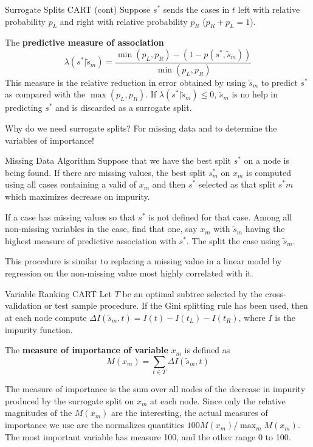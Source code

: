 \documentclass{beamer}
\begin{document}
\begin{frame}{Surrogate Splits CART (cont)}
	Suppose $s^*$ sends the cases in $t$ left with relative probability $p_L$ and right with relative probability $p_R$ ($p_R+p_L=1$).
	
	The \textbf{predictive measure of association} 
	\begin{equation*}
		\lambda(s^*| \tilde{s}_m)= \frac{\min(p_L,p_R)-(1-p(s^*,\tilde{s}_m))}{\min(p_L,p_R)}
	\end{equation*}
	This measure is the relative reduction in error obtained by using $\tilde{s}_m$ to predict $s^*$ as compared with the $\max (p_L,p_R)$. If $\lambda(s^*| \tilde{s}_m)\le 0$, $\tilde{s}_m$ is no help in predicting $s^*$ and is discarded as a surrogate split. 
	
	Why do we need surrogate splits? For missing data and to determine the variables of importance!
	

\end{frame}

\begin{frame}{Missing Data Algorithm}
	Suppose that we have the best split $s^*$ on a node is being found. If there are missing values, the best split $s^*_m$ on $x_m$ is computed using all cases containing a valid of $x_m$ and then $s^*$ selected as that split $s^*m$ which maximizes decrease on impurity.
	
	If a case has missing values so that $s^*$ is not defined for that case. Among all non-missing variables in the case, find that one, say $x_m$ with $\tilde{s}_m$ having the highest measure of predictive association with $s^*$. The split the case using $\tilde{s}_m$.
	
	This procedure is similar to replacing a missing value in a linear model by regression on the non-missing value most highly correlated with it. 
	
\end{frame}

\begin{frame}{Variable Ranking CART}
	Let $T$ be an optimal subtree selected by the cross-validation or test sample procedure. If the Gini splitting rule has been used, then at each node compute $\Delta I(\tilde{s}_m,t)= I(t)-I(t_L)-I(t_R)$, where $I$ is the impurity function.
	
	The \textbf{measure of importance of variable} $x_m$ is defined as
	\begin{equation*}
		M(x_m)= \sum_{t\in T} \Delta I (\tilde{s}_m, t)
	\end{equation*}

	The measure of importance is the sum over all nodes of the decrease in impurity produced by the surrogate split on $x_m$ at each node. Since only the relative magnitudes of the $M(x_m)$ are the interesting, the actual measures of importance we use are the normalizes quantities $100 M(x_m)/\max_m M(x_m)$. The most important variable has measure 100, and the other range 0 to 100.
\end{frame}
\end{document}
